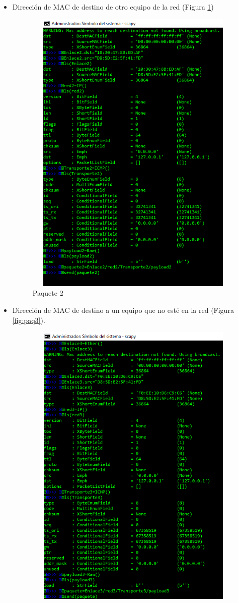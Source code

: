 \documentclass{article}
\begin{document}
\begin{itemize}
    \item Dirección de MAC de destino de otro equipo de la red (Figura \ref{fig:paq2})\\
\begin{figure}[h!]
\centering
\includegraphics[scale=05, width=12cm, height=14cm]{sshot-2.png}
\caption{Paquete 2}
\label{fig:paq2}
\end{figure}
    \newpage
    \item Dirección de MAC de destino a un equipo que no esté en la red (Figura \ref{fig:paq3}).\\
\begin{figure}[h!]
\centering
\includegraphics[scale=05, width=12cm, height=14cm]{sshot-3.png}

\end{figure}
\end{itemize}
\end{document}
